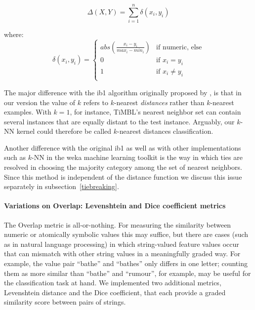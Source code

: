 \documentclass{book}
\begin{document}
\begin{equation}
\Delta(X,Y) = \sum_{i=1}^{n} \delta(x_{i},y_{i})
\label{distance}
\end{equation}

where:
\begin{equation}
\delta(x_{i}, y_{i}) = \left\{ \begin{array}{ll}
		abs(\frac{x_{i}-y_{i}}{max_{i}-min_{i}}) & \mbox{if numeric, else}\\
		0 & \mbox{if $x_{i} = y_{i}$}\\
		1 & \mbox{if $x_{i} \neq y_{i}$}\\
	\end{array} \right.
\label{overlapeq}
\end{equation}

The major difference with the {\sc ib1} algorithm originally proposed
by \cite{Aha+91}, is that in our version the value of $k$ refers to
$k$-nearest {\em distances}\/ rather than $k$-nearest examples. With
$k=1$, for instance, TiMBL's nearest neighbor set can contain several
instances that are equally distant to the test instance. Arguably, our
$k$-NN kernel could therefore be called $k$-nearest distances
classification.

Another difference with the original {\sc ib1} as well as with other
implementations such as $k$-NN in the {\sc weka} machine learning
toolkit \cite{Witten+99} is the way in which ties are resolved in
choosing the majority category among the set of nearest
neighbors. Since this method is independent of the distance function
we discuss this issue separately in subsection~\ref{tiebreaking}.

\paragraph{Variations on Overlap: Levenshtein and Dice coefficient metrics}

The Overlap metric is all-or-nothing. For measuring the similarity
between numeric or atomically symbolic values this may suffice, but
there are cases (such as in natural language processing) in which
string-valued feature values occur that can mismatch with other string
values in a meaningfully graded way. For example, the value pair
``bathe'' and ``bathes'' only differs in one letter; counting them as
more similar than ``bathe'' and ``rumour'', for example, may be useful
for the classification task at hand. We implemented two additional
metrics, Levenshtein distance and the Dice coefficient, that each
provide a graded similarity score between pairs of strings.
\end{document}

